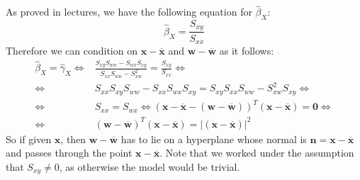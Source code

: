 \documentclass[a4paper]{article}
\begin{document}
As proved in lectures, we have the following equation for $\hat{\beta}_{X}$:
\begin{equation*}
	\hat{\beta}_{X} = \frac{S_{xy}}{S_{xx}}
\end{equation*}
Therefore we can condition on $\textbf{x}-\overline{\textbf{x}}$ and $\textbf{w}-\overline{\textbf{w}}$ as it follows:
\begin{equation*}
\begin{split}
	\hat{\beta}_{X} = \hat{\gamma}_{X} \Leftrightarrow & \frac{S_{xy}S_{ww} - S_{wx}S_{xy}}{S_{xx}S_{ww}-S_{xw}^2} = \frac{S_{xy}}{S_{xx}}  \Leftrightarrow \\
	\Leftrightarrow & S_{xx}S_{xy}S_{ww}-S_{xx}S_{wx}S_{xy} = S_{xy}S_{xx}S_{ww} - S_{xw}^2S_{xy} \Leftrightarrow \\
	\Leftrightarrow & S_{xx}=S_{wx} \Leftrightarrow (\textbf{x}-\overline{\textbf{x}}-(\textbf{w}-\overline{\textbf{w}}))^{T}(\textbf{x}-\overline{\textbf{x}})=\textbf{0} \Leftrightarrow \\
	\Leftrightarrow & (\textbf{w}-\overline{\textbf{w}})^T(\textbf{x}-\overline{\textbf{x}}) = |(\textbf{x}-\overline{\textbf{x}})|^2
\end{split}
\end{equation*}
So if given $\textbf{x}$, then $\textbf{w}-\overline{\textbf{w}}$ has to lie on a hyperplane whose normal is $\textbf{n}= \textbf{x}-\overline{\textbf{x}}$ and passes through the point $\textbf{x}-\overline{\textbf{x}}$. Note that we worked under the assumption that $S_{xy} \neq 0$, as otherwise the model would be trivial.
\end{document}
